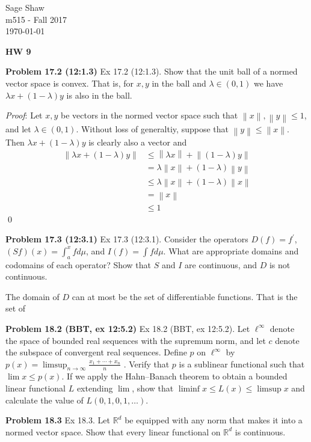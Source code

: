 \documentclass[12pt]{article}
\newcommand{\problem}[1]{\hspace{-4 ex} \large \textbf{Problem #1} }
\newcommand{\norm}[1]{\left\lVert#1\right\rVert}
\renewenvironment{proof}{\hspace{-4 ex} \emph{Proof}:}{\qed}
\newcommand{\RR}{\mathbb{R}}
\begin{document}
	\thispagestyle{empty}
	
	\begin{flushright}
		Sage Shaw \\
		m515 - Fall 2017 \\
		\today
	\end{flushright}
	
{\large \textbf{HW 9}}\bigbreak

\problem{17.2 (12:1.3)}
Ex 17.2 (12:1.3). Show that the unit ball of a normed vector space is convex. That is, for $x,y$ in the ball and $\lambda\in(0,1)$ we have $\lambda x+(1-\lambda)y$ is also in the ball.

	\begin{proof}
		Let $x,y$ be vectors in the normed vector space such that $\norm{x},\norm{y} \leq 1$, and let $\lambda \in (0,1)$. Without loss of generaltiy, suppose that $\norm{y} \leq \norm{x}$. Then $\lambda x + (1 -\lambda)y$ is clearly also a vector and
		\begin{align*}
			\norm{\lambda x + (1 -\lambda)y} & \leq \norm{\lambda x} + \norm{(1 -\lambda)y} \\
			& = \lambda\norm{ x} + (1 -\lambda)\norm{y} \\
			& \leq \lambda\norm{ x} + (1 -\lambda)\norm{x} \\
			& = \norm{x} \\
			& \leq 1
		\end{align*}
	\end{proof}


\problem{17.3 (12:3.1)}
Ex 17.3 (12:3.1). Consider the operators $D(f)=f^\prime$, $(Sf)(x)=\int_a^x fd\mu$, and $I(f)=\int fd\mu$. What are appropriate domains and codomains of each operator? Show that $S$ and $I$ are continuous, and $D$ is not continuous. \bigbreak

	The domain of $D$ can at most be the set of differentiable functions. That is the set of 

\problem{18.2 (BBT, ex 12:5.2)}
Ex 18.2 (BBT, ex 12:5.2). Let $\ell^\infty$ denote the space of bounded real sequences with the supremum norm, and let $c$ denote the subspace of convergent real sequences. Define $p$ on $\ell^\infty$ by
$p(x)=\limsup_{n\to\infty}\frac{x_1+\cdots+x_n}{n}$ .
Verify that $p$ is a sublinear functional such that $\lim x\leq p(x)$. If we apply the Hahn--Banach theorem to obtain a bounded linear functional $L$ extending $\lim$, show that $\liminf x\leq L(x)\leq\limsup x$ and calculate the value of $L(0,1,0,1,\ldots)$.

\problem{18.3}
Ex 18.3. Let $\RR^d$ be equipped with any norm that makes it into a normed vector space. Show that every linear functional on $\RR^d$ is continuous.
\end{document}
